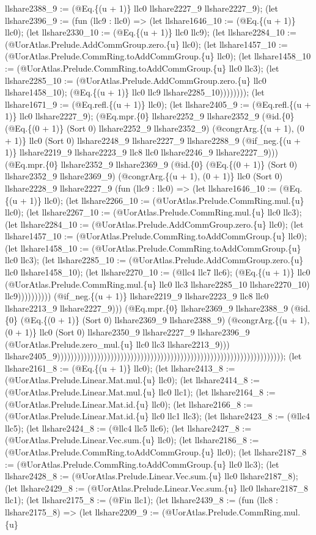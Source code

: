 \documentclass[11pt]{article}
\begin{document}
llshare2388\_9 := (@Eq.\{(u + 1)\} llc0 llshare2227\_9 llshare2227\_9); (let llshare2396\_9 := (fun (llc9 : llc0) => (let llshare1646\_10 := (@Eq.\{(u + 1)\} llc0); (let llshare2330\_10 := (@Eq.\{(u + 1)\} llc0 llc9); (let llshare2284\_10 := (@UorAtlas.Prelude.AddCommGroup.zero.\{u\} llc0); (let llshare1457\_10 := (@UorAtlas.Prelude.CommRing.toAddCommGroup.\{u\} llc0); (let llshare1458\_10 := (@UorAtlas.Prelude.CommRing.toAddCommGroup.\{u\} llc0 llc3); (let llshare2285\_10 := (@UorAtlas.Prelude.AddCommGroup.zero.\{u\} llc0 llshare1458\_10); (@Eq.\{(u + 1)\} llc0 llc9 llshare2285\_10)))))))); (let llshare1671\_9 := (@Eq.refl.\{(u + 1)\} llc0); (let llshare2405\_9 := (@Eq.refl.\{(u + 1)\} llc0 llshare2227\_9); (@Eq.mpr.\{0\} llshare2252\_9 llshare2352\_9 (@id.\{0\} (@Eq.\{(0 + 1)\} (Sort 0) llshare2252\_9 llshare2352\_9) (@congrArg.\{(u + 1), (0 + 1)\} llc0 (Sort 0) llshare2248\_9 llshare2227\_9 llshare2288\_9 (@if\_neg.\{(u + 1)\} llshare2219\_9 llshare2223\_9 llc8 llc0 llshare2246\_9 llshare2227\_9))) (@Eq.mpr.\{0\} llshare2352\_9 llshare2369\_9 (@id.\{0\} (@Eq.\{(0 + 1)\} (Sort 0) llshare2352\_9 llshare2369\_9) (@congrArg.\{(u + 1), (0 + 1)\} llc0 (Sort 0) llshare2228\_9 llshare2227\_9 (fun (llc9 : llc0) => (let llshare1646\_10 := (@Eq.\{(u + 1)\} llc0); (let llshare2266\_10 := (@UorAtlas.Prelude.CommRing.mul.\{u\} llc0); (let llshare2267\_10 := (@UorAtlas.Prelude.CommRing.mul.\{u\} llc0 llc3); (let llshare2284\_10 := (@UorAtlas.Prelude.AddCommGroup.zero.\{u\} llc0); (let llshare1457\_10 := (@UorAtlas.Prelude.CommRing.toAddCommGroup.\{u\} llc0); (let llshare1458\_10 := (@UorAtlas.Prelude.CommRing.toAddCommGroup.\{u\} llc0 llc3); (let llshare2285\_10 := (@UorAtlas.Prelude.AddCommGroup.zero.\{u\} llc0 llshare1458\_10); (let llshare2270\_10 := (@llc4 llc7 llc6); (@Eq.\{(u + 1)\} llc0 (@UorAtlas.Prelude.CommRing.mul.\{u\} llc0 llc3 llshare2285\_10 llshare2270\_10) llc9)))))))))) (@if\_neg.\{(u + 1)\} llshare2219\_9 llshare2223\_9 llc8 llc0 llshare2213\_9 llshare2227\_9))) (@Eq.mpr.\{0\} llshare2369\_9 llshare2388\_9 (@id.\{0\} (@Eq.\{(0 + 1)\} (Sort 0) llshare2369\_9 llshare2388\_9) (@congrArg.\{(u + 1), (0 + 1)\} llc0 (Sort 0) llshare2350\_9 llshare2227\_9 llshare2396\_9 (@UorAtlas.Prelude.zero\_mul.\{u\} llc0 llc3 llshare2213\_9))) llshare2405\_9)))))))))))))))))))))))))))))))))))))))))))))))))))))))))))))))))))); (let llshare2161\_8 := (@Eq.\{(u + 1)\} llc0); (let llshare2413\_8 := (@UorAtlas.Prelude.Linear.Mat.mul.\{u\} llc0); (let llshare2414\_8 := (@UorAtlas.Prelude.Linear.Mat.mul.\{u\} llc0 llc1); (let llshare2164\_8 := (@UorAtlas.Prelude.Linear.Mat.id.\{u\} llc0); (let llshare2166\_8 := (@UorAtlas.Prelude.Linear.Mat.id.\{u\} llc0 llc1 llc3); (let llshare2423\_8 := (@llc4 llc5); (let llshare2424\_8 := (@llc4 llc5 llc6); (let llshare2427\_8 := (@UorAtlas.Prelude.Linear.Vec.sum.\{u\} llc0); (let llshare2186\_8 := (@UorAtlas.Prelude.CommRing.toAddCommGroup.\{u\} llc0); (let llshare2187\_8 := (@UorAtlas.Prelude.CommRing.toAddCommGroup.\{u\} llc0 llc3); (let llshare2428\_8 := (@UorAtlas.Prelude.Linear.Vec.sum.\{u\} llc0 llshare2187\_8); (let llshare2429\_8 := (@UorAtlas.Prelude.Linear.Vec.sum.\{u\} llc0 llshare2187\_8 llc1); (let llshare2175\_8 := (@Fin llc1); (let llshare2439\_8 := (fun (llc8 : llshare2175\_8) => (let llshare2209\_9 := (@UorAtlas.Prelude.CommRing.mul.\{u\} 
\end{document}
